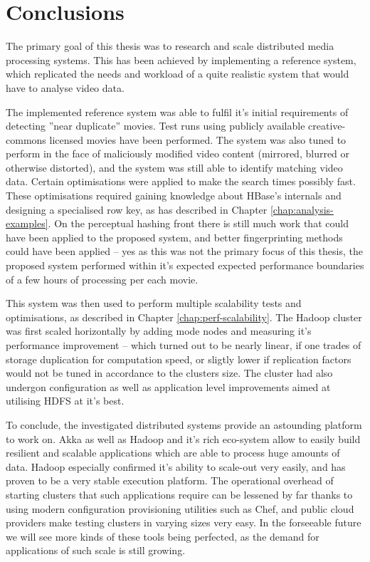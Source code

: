 \chapter{Conclusions}
\label{chap:conclusions}

The primary goal of this thesis was to research and scale distributed media processing systems. This has been achieved by implementing a reference system, which replicated the needs and workload of a quite realistic system that would have to analyse video data.

The implemented reference system was able to fulfil it's initial requirements of detecting ''near duplicate'' movies. Test runs using publicly available creative-commons licensed movies have been performed. The system was also tuned to perform in the face of maliciously modified video content (mirrored, blurred or otherwise distorted), and the system was still able to identify matching video data. Certain optimisations were applied to make the search times possibly fast. These optimisations required gaining knowledge about HBase's internals and designing a specialised row key, as has described in Chapter \ref{chap:analysis-examples}. On the perceptual hashing front there is still much work that could have been applied to the proposed system, and better fingerprinting methods could have been applied -- yes as this was not the primary focus of this thesis, the proposed system performed within it's expected expected performance boundaries of a few hours of processing per each movie.

This system was then used to perform multiple scalability tests and optimisations, as described in Chapter \ref{chap:perf-scalability}. The Hadoop cluster was first scaled horizontally by adding mode nodes and measuring it's performance improvement -- which turned out to be nearly linear, if one trades of storage duplication for computation speed, or sligtly lower if replication factors would not be tuned in accordance to the clusters size. The cluster had also undergon configuration as well as application level improvements aimed at utilising HDFS at it's best.

To conclude, the investigated distributed systems provide an astounding platform to work on. Akka as well as Hadoop and it's rich eco-system allow to easily build resilient and scalable applications which are able to process huge amounts of data. Hadoop especially confirmed it's ability to scale-out very easily, and has proven to be a very stable execution platform. The operational overhead of starting clusters that such applications require can be lessened by far thanks to using modern configuration provisioning utilities such as Chef, and public cloud providers make testing clusters in varying sizes very easy. In the forseeable future we will see more kinds of these tools being perfected, as the demand for applications of such scale is still growing.